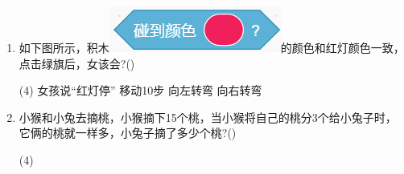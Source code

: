 \documentclass[10pt, a4paper]{article}
\begin{document}
\begin{enumerate}
        \item 如下图所示，积木\includegraphics[width=.1\textwidth]{11-1.png}的颜色和红灯颜色一致，点击绿旗后，女该会?(\qquad)
        \begin{tasks}(4)
            \task 女孩说“红灯停”
            \task 移动10步
            \task 向左转弯
            \task 向右转弯
        \end{tasks}

        \item 小猴和小兔去摘桃，小猴摘下15个桃，当小猴将自己的桃分3个给小兔子时，它俩的桃就一样多，小兔子摘了多少个桃?(\qquad)
        \begin{tasks}(4)
        \end{tasks}


\end{enumerate}
\end{document}
